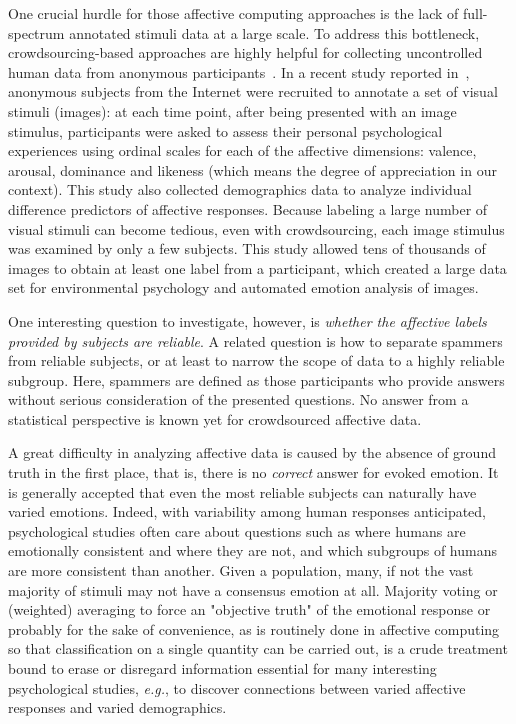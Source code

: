 \documentclass[10pt,journal,letterpaper,compsoc,twoside]{IEEEtran}
\begin{document}
One crucial hurdle for those affective computing approaches is the lack
of full-spectrum annotated stimuli data at a large scale. 
To address this bottleneck, crowdsourcing-based approaches are highly helpful
for collecting uncontrolled human data from anonymous participants~\cite{howe2006rise}.
In a recent study reported in~\cite{xin2016}, 
anonymous subjects from the Internet were recruited to annotate
a set of visual stimuli (images): 
at each time point, after being presented with an image stimulus, participants were asked 
to assess their personal psychological experiences 
using ordinal scales for each of the affective dimensions: valence, arousal, dominance and likeness (which means the degree of appreciation in our context). This study also collected
demographics data to analyze individual difference predictors of 
affective responses. 
Because labeling a large number of visual stimuli can become tedious, 
even with crowdsourcing, each image stimulus was examined by only a few subjects.
This study allowed tens of thousands of images to obtain at least
one label from a participant, which created a large data set for 
environmental psychology and automated emotion analysis of images. 

One interesting question to investigate, however, is {\it whether the affective labels provided by subjects are reliable}. {A related question is how to separate spammers from reliable subjects, or at least to narrow the scope of data to a highly reliable subgroup. Here, spammers are defined as those participants who provide answers without 
serious consideration of the presented questions. No answer from a statistical perspective is known yet for crowdsourced affective data. }

A great difficulty in analyzing affective data is caused by the absence of ground truth in the first place, that is, there is no {\it correct} answer for evoked emotion. It is generally accepted that even the most reliable subjects can naturally have varied emotions. Indeed, with variability among human responses anticipated, psychological studies often care about questions such as {where humans are emotionally consistent and where they are not}, and {which subgroups of humans are more consistent} than another.  Given a population, many, if not the vast majority of stimuli may not have a consensus emotion at all.
{Majority voting or (weighted) averaging to force an "objective truth" of the emotional response or probably for the sake of convenience, as is routinely done in affective computing so that classification on a single quantity can be carried out, is a crude treatment bound to erase or disregard information essential for 
many interesting psychological studies, {\it e.g.},
to discover connections between varied affective responses and varied demographics.}
\end{document}

